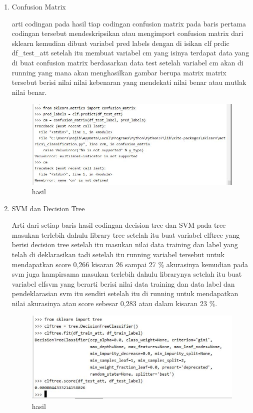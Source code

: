 \begin{enumerate}
\item Confusion Matrix\par
arti codingan pada hasil tiap codingan confusion matrix pada baris pertama codingan tersebut mendeskripsikan atau mengimport confusion matrix dari sklearn kemudian dibuat variabel pred labels dengan di isikan clf prdic df\_test\_att setelah itu membuat variabel cm yang isinya terdapat data yang di buat confusion matrix berdasarkan data test setelah variabel cm akan di running yang mana akan menghasilkan gambar berupa matrix matrix tersebut berisi nilai nilai kebenaran yang mendekati nilai benar atau mutlak nilai benar.

\begin{figure}[ht]
\centering
\includegraphics[scale=0.5]{figures/1174042/chapter3/2,5.JPG}
\caption{hasil}
\label{contoh}
\end{figure}

\item SVM dan Decision Tree\par
Arti dari setiap baris hasil codingan decision tree dan SVM pada tree masukan terlebih dahulu library tree setelah itu buat variabel clftree yang berisi decision tree setelah itu masukan nilai data training dan label yang telah di deklarasikan tadi setelah itu running variabel tersebut untuk mendapatkan score 0,266 kisaran 26 sampai 27 \% akurasinya kemudian pada svm juga hampirsama masukan terlebih dahulu librarynya setelah itu buat variabel clfsvm yang berarti berisi nilai data training dan data label dan pendeklarasian svm itu sendiri setelah itu di running untuk mendapatkan nilai akurasinya atau score sebesar 0,283 atau dalam kisaran 23 \%.

\begin{figure}[ht]
\centering
\includegraphics[scale=0.5]{figures/1174042/chapter3/2,6.JPG}
\caption{hasil}
\label{contoh}
\end{figure}


\end{enumerate}

